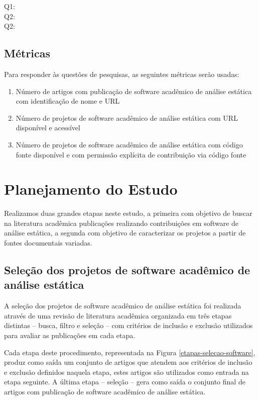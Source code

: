 \begin{description}
  \item [Q1:] \EstudoUmQuestaoUm
  \item [Q2:] \EstudoUmQuestaoDois
  \item [Q2:] \EstudoUmQuestaoTres
\end{description}

\subsection{Métricas}

Para responder às questões de pesquisas, as seguintes métricas serão usadas:

\begin{enumerate}
  \item Número de artigos com publicação de software acadêmico de análise estática com identificação de nome e URL
  \item Número de projetos de software acadêmico de análise estática com URL disponível e acessível
  \item Número de projetos de software acadêmico de análise estática com código fonte disponível e com permissão explícita de contribuição via código fonte
\end{enumerate}


\section{Planejamento do Estudo} \label{estudo1:planejamento}

Realizamos duas grandes etapas neste estudo, a primeira com objetivo de buscar
na literatura acadêmica publicações realizando contribuições em software de
análise estática, a segunda com objetivo de caracterizar os projetos a partir
de fontes documentais variadas.

\subsection{Seleção dos projetos de software acadêmico de análise estática} %

A seleção dos projetos de software acadêmico de análise estática foi realizada
através de uma revisão de literatura acadêmica organizada em três etapas
distintas -- busca, filtro e seleção -- com critérios de inclusão e exclusão
utilizados para avaliar as publicações em cada etapa.

Cada etapa deste procedimento, representada na Figura
\ref{etapas-selecao-software}, produz como saída um conjunto de artigos que
atendem aos critérios de inclusão e exclusão definidos naquela etapa, estes
artigos são utilizados como entrada na etapa seguinte. A última etapa --
seleção -- gera como saída o conjunto final de artigos com publicação de
software acadêmico de análise estática.

